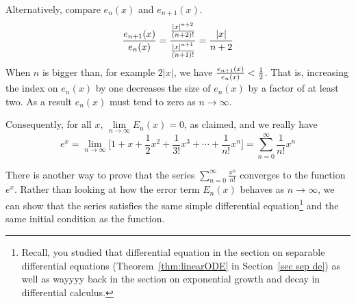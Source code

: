 \begin{eg}[Optional --- Why  $\sum_{n=0}^\infty \frac{1}{n!}x^n$ is $e^x$.]
Alternatively, compare $e_n(x)$ and $e_{n+1}(x)$.
\begin{equation*}
\frac{e_{n+1}(x)}{e_n(x)}
     =\frac{\vphantom{\Big[}\tfrac{|x|^{n+2}}{(n+2)!}}
           {\vphantom{\Big[}\tfrac{|x|^{n+1}}{(n+1)!}}
     =\frac{|x|}{n+2}
\end{equation*}
When $n$ is  bigger than, for example $2|x|$, we have $\tfrac{e_{n+1}(x)}{e_n(x)}<\tfrac{1}{2}$. That is, increasing the index
on $e_n(x)$ by one decreases the size of $e_n(x)$ by a factor of at least two. As a result $e_n(x)$ must tend to zero
as $n\rightarrow\infty$.


Consequently, for all $x$,  $\lim\limits_{n\rightarrow\infty}E_n(x)=0$,
as claimed, and we really have
\begin{equation*}
e^x=\lim_{n\rightarrow\infty}\Big[1 +x + \frac{1}{2} x^2
     +\frac{1}{3!} x^3+\cdots+\frac{1}{n!} x^n\Big]
    =\sum_{n=0}^\infty \frac{1}{n!}x^n
\end{equation*}
\end{eg}



There is another way to prove that the series $\sum_{n=0}^\infty \frac{x^n}{n!}$ converges to the function $e^x$.
Rather than looking at how the error term $E_n(x)$ behaves as $n \to \infty$, we can show that the series
satisfies the same simple differential equation\footnote{Recall, you studied that differential equation in the
section on separable differential equations (Theorem~\ref{thm:linearODE} in Section~\ref{sec sep de}) as well as
wayyyy back in the section on exponential growth and decay in differential calculus.} and the same initial condition as the function.

